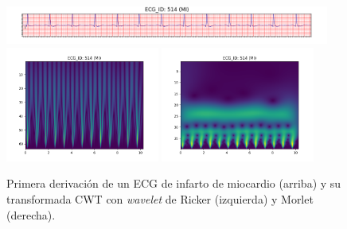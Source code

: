\begin{figure}[t]\ContinuedFloat
	\centering
	\includegraphics[width=0.95\textwidth]{Imagenes/Vectorial/Transformadas/MI/ecg.png}
	\includegraphics[width=0.45\textwidth]{Imagenes/Vectorial/Transformadas/MI/cwt_ricker.png}
	\includegraphics[width=0.45\textwidth]{Imagenes/Vectorial/Transformadas/MI/cwt_morlet.png}
	\par Primera derivación de un ECG de infarto de miocardio (arriba) y su transformada CWT con \emph{wavelet} de Ricker (izquierda) y Morlet (derecha).
	\vspace{1cm}


\end{figure}
